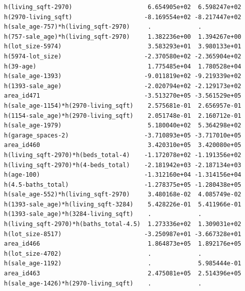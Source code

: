 \documentclass[
]{article}
\begin{document}
\begin{verbatim}
h(living_sqft-2970)                     6.654905e+02  6.598247e+02
h(2970-living_sqft)                    -8.169554e+02 -8.217447e+02
h(sale_age-757)*h(living_sqft-2970)     .             .           
h(757-sale_age)*h(living_sqft-2970)     1.382236e+00  1.394267e+00
h(lot_size-5974)                        3.583293e+01  3.980133e+01
h(5974-lot_size)                       -2.370580e+02 -2.365904e+02
h(39-age)                               1.775485e+04  1.780528e+04
h(sale_age-1393)                       -9.011819e+02 -9.219339e+02
h(1393-sale_age)                       -2.020794e+02 -2.129173e+02
area_id471                             -3.513270e+05 -3.561529e+05
h(sale_age-1154)*h(2970-living_sqft)    2.575681e-01  2.656957e-01
h(1154-sale_age)*h(2970-living_sqft)    2.051748e-01  2.160712e-01
h(sale_age-1979)                        5.180040e+02  5.364298e+02
h(garage_spaces-2)                     -3.710893e+05 -3.717010e+05
area_id460                              3.420310e+05  3.420080e+05
h(living_sqft-2970)*h(beds_total-4)    -1.172078e+02 -1.191356e+02
h(living_sqft-2970)*h(4-beds_total)    -2.181942e+03 -2.187134e+03
h(age-100)                             -1.312160e+04 -1.314156e+04
h(4.5-baths_total)                     -1.278375e+05 -1.280438e+05
h(sale_age-552)*h(living_sqft-2970)     3.480168e-02  4.085749e-02
h(1393-sale_age)*h(living_sqft-3284)    5.428226e-01  5.411966e-01
h(1393-sale_age)*h(3284-living_sqft)    .             .           
h(living_sqft-2970)*h(baths_total-4.5)  1.273336e+02  1.309031e+02
h(lot_size-8517)                       -3.250987e+01 -3.667328e+01
area_id466                              1.864873e+05  1.892176e+05
h(lot_size-4702)                        .             .           
h(sale_age-1192)                        .             5.985444e-01
area_id463                              2.475081e+05  2.514396e+05
h(sale_age-1426)*h(2970-living_sqft)    .             .           
                                                                  

\end{verbatim}
\end{document}
